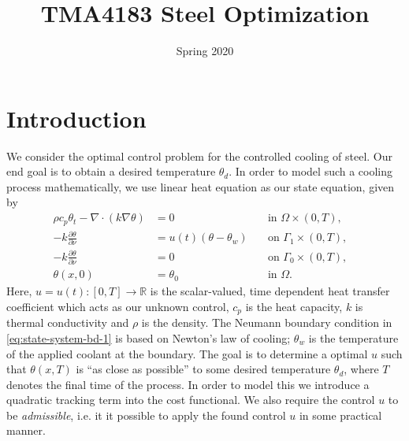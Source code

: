 \documentclass{article}
\title{TMA4183 Steel Optimization}
\author{}
\date{Spring 2020}
\begin{document}
\maketitle

\section{Introduction}
We consider the optimal control problem for the controlled cooling of steel. Our end goal is to obtain a desired temperature $\theta_d$. In order to model such a cooling process mathematically, we use linear heat equation as our state equation, given by
\begin{subequations}
   \label{eq:heat}
   \begin{align}
      \rho c_p \theta_t - \nabla \cdot (k \nabla \theta) &= 0 \quad &\text{in } \Omega \times (0,T),\label{eq:heat-in-omega} \\
      -k \frac{\partial \theta}{\partial \nu} &= u(t) (\theta - \theta_w) \quad &\text{on } \Gamma_1 \times (0,T), \label{eq:state-system-bd-1} \\
      -k \frac{\partial \theta}{\partial \nu} &= 0 \quad &\text{on } \Gamma_0 \times (0,T), \label{eq:state-system-bd-2} \\
      \theta(x, 0) &= \theta_0 &\text{in } \Omega. &
   \end{align}
\end{subequations}
Here, $u = u(t) \colon [0, T] \to \mathbb{R}$ is the scalar-valued, time dependent heat transfer coefficient which acts as our unknown control, $c_p$ is the heat capacity, $k$ is thermal conductivity and $\rho$ is the density. The Neumann boundary condition in \eqref{eq:state-system-bd-1} is based on Newton's law of cooling; $\theta_w$ is the temperature of the applied coolant at the boundary. The goal is to determine a optimal $u$ such that $\theta(x, T)$ is ``as close as possible'' to some desired temperature $\theta_d$, where $T$ denotes the final time of the process. In order to model this we introduce a quadratic tracking term into the cost functional. We also require the control $u$ to be \emph{admissible}, i.e. it it possible to apply the found control $u$ in some practical manner.
\end{document}
